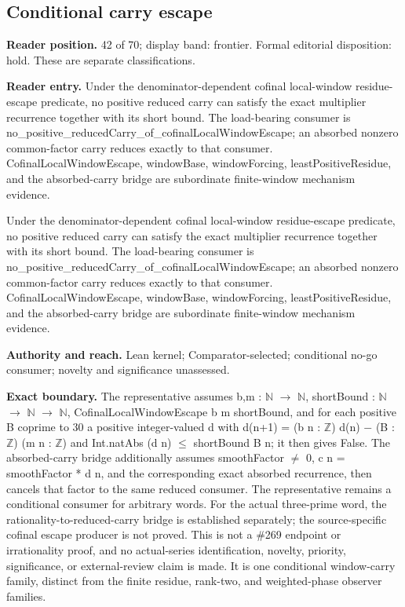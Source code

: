 \documentclass[11pt]{article}
\begin{document}
\subsection{Conditional carry escape}
\textbf{Reader position.} 42 of 70; display band: frontier.  Formal editorial disposition: hold.  These are separate classifications.

\textbf{Reader entry.} Under the denominator-dependent cofinal local-window residue-escape predicate, no positive reduced carry can satisfy the exact multiplier recurrence together with its short bound. The load-bearing consumer is no\_positive\_reducedCarry\_of\_cofinalLocalWindowEscape; an absorbed nonzero common-factor carry reduces exactly to that consumer. CofinalLocalWindowEscape, windowBase, windowForcing, leastPositiveResidue, and the absorbed-carry bridge are subordinate finite-window mechanism evidence.

Under the denominator-dependent cofinal local-window residue-escape predicate, no positive reduced carry can satisfy the exact multiplier recurrence together with its short bound. The load-bearing consumer is no\_positive\_reducedCarry\_of\_cofinalLocalWindowEscape; an absorbed nonzero common-factor carry reduces exactly to that consumer. CofinalLocalWindowEscape, windowBase, windowForcing, leastPositiveResidue, and the absorbed-carry bridge are subordinate finite-window mechanism evidence.

\textbf{Authority and reach.} Lean kernel; Comparator-selected; conditional no-go consumer; novelty and significance unassessed.

\textbf{Exact boundary.} The representative assumes b,m : \ensuremath{\mathbb{N}} \ensuremath{\to} \ensuremath{\mathbb{N}}, shortBound : \ensuremath{\mathbb{N}} \ensuremath{\to} \ensuremath{\mathbb{N}} \ensuremath{\to} \ensuremath{\mathbb{N}}, CofinalLocalWindowEscape b m shortBound, and for each positive B coprime to 30 a positive integer-valued d with d(n+1) = (b n : \ensuremath{\mathbb{Z}}) d(n) \ensuremath{-} (B : \ensuremath{\mathbb{Z}}) (m n : \ensuremath{\mathbb{Z}}) and Int.natAbs (d n) \ensuremath{\le} shortBound B n; it then gives False. The absorbed-carry bridge additionally assumes smoothFactor \ensuremath{\ne} 0, c n = smoothFactor * d n, and the corresponding exact absorbed recurrence, then cancels that factor to the same reduced consumer. The representative remains a conditional consumer for arbitrary words. For the actual three-prime word, the rationality-to-reduced-carry bridge is established separately; the source-specific cofinal escape producer is not proved. This is not a \#269 endpoint or irrationality proof, and no actual-series identification, novelty, priority, significance, or external-review claim is made. It is one conditional window-carry family, distinct from the finite residue, rank-two, and weighted-phase observer families.
\end{document}
